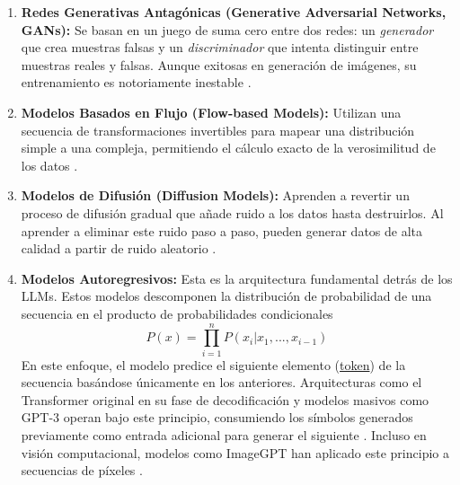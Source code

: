 \documentclass[11pt, a4paper]{article}
\begin{document}
\begin{enumerate}
    \item \textbf{Redes Generativas Antagónicas (Generative Adversarial Networks, GANs):} Se basan en un juego de suma
    cero entre dos redes: un \textit{generador} que crea muestras falsas y un \textit{discriminador} que intenta distinguir entre
    muestras reales y falsas. Aunque exitosas en generación de imágenes, su entrenamiento es notoriamente inestable 
    \cite{goodfellow_generative_nodate}.
    \item \textbf{Modelos Basados en Flujo (Flow-based Models):}  Utilizan una secuencia de transformaciones
    invertibles para mapear una distribución simple a una compleja, permitiendo el cálculo exacto de la verosimilitud de los datos 
    \cite{rezende_variational_nodate}.
    \item \textbf{Modelos de Difusión (Diffusion Models):} Aprenden a revertir un proceso de 
    difusión gradual que añade ruido a los datos hasta destruirlos. Al aprender a eliminar este ruido paso a paso, pueden generar 
    datos de alta calidad a partir de ruido aleatorio \cite{ho_denoising_nodate}.
    \item \textbf{Modelos Autoregresivos:} Esta es la arquitectura fundamental detrás de los LLMs. Estos modelos descomponen la
    distribución de probabilidad de una secuencia en el producto de probabilidades condicionales
    \begin{equation}
        P(x) = \prod_{i=1}^{n} P(x_i | x_1, ..., x_{i-1})
    \end{equation}
    En este enfoque, el modelo predice el siguiente elemento (\hyperlink{glo:token}{token}) de la secuencia basándose únicamente en los anteriores.
    Arquitecturas como el Transformer original en su fase de decodificación \cite{vaswani_attention_nodate} y modelos masivos como 
    GPT-3 operan bajo este principio, consumiendo los símbolos generados previamente como entrada adicional para generar el 
    siguiente \cite{vaswani_attention_nodate, brown_language_nodate}. Incluso en visión computacional, modelos como ImageGPT han aplicado este
    principio a secuencias de píxeles \cite{dosovitskiy_image_2021}.
\end{enumerate}


\end{document}
